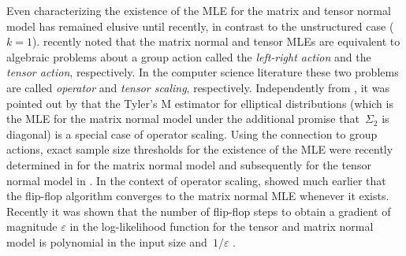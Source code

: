\documentclass[aos]{imsart}
\theoremstyle{definition}
\numberwithin{equation}{section}
\newcommand{\eps}{\varepsilon}
\newcommand{\CF}[1]{{\color{purple}[CF: #1]}}
\newcommand{\CF}[1]{{}}
\begin{document}
Even characterizing the existence of the MLE for the matrix and tensor normal model has remained elusive until recently, in contrast to the unstructured case ($k=1$).
\cite{amendola2020invariant} recently noted that the matrix normal and tensor MLEs are equivalent to algebraic problems about a group action called the \emph{left-right action} and the \emph{tensor action}, respectively.
In the computer science literature these two problems are called \emph{operator} and \emph{tensor scaling}, respectively.
Independently from \cite{amendola2020invariant}, it was pointed out by \cite{FM20} that the Tyler's M estimator for elliptical distributions (which is the MLE for the matrix normal model under the additional promise that~$\Sigma_2$ is diagonal) is a special case of operator scaling.
Using the connection to group actions, exact sample size thresholds for the existence of the MLE were recently determined in \cite{derksen2020matrix} for the matrix normal model and subsequently for the tensor normal model in \cite{derksen2020tensor}.
In the context of operator scaling, \cite{gurvits2004classical} showed much earlier that the flip-flop algorithm converges to the matrix normal MLE whenever it exists.
Recently it was shown that the number of flip-flop steps to obtain a gradient of magnitude $\eps$ in the log-likelihood function for the tensor and matrix normal model is polynomial in the input size and~$1/\eps$ \citep{GGOW19,burgisser2017alternating,burgisser2019towards}.


\end{document}
